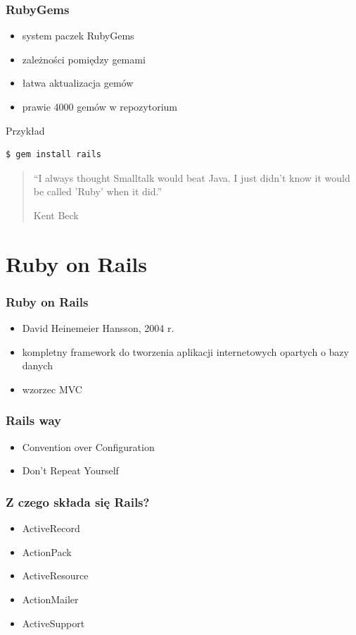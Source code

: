 \documentclass[12t]{beamer}
\begin{document}
\begin{frame}[fragile]
  \frametitle{RubyGems}
  \begin{itemize}
  \item system paczek RubyGems
  \item zależności pomiędzy gemami
  \item łatwa aktualizacja gemów
  \item prawie 4000 gemów w repozytorium
  \end{itemize}
  \begin{block}{Przykład}
\begin{verbatim}
$ gem install rails
\end{verbatim}
  \end{block}
\end{frame}

\begin{frame}
  \begin{quote}
    “I always thought Smalltalk would beat Java. I just
    didn't know it would be called 'Ruby' when it did.”

    \hfill Kent Beck
  \end{quote}
\end{frame}

\section{Ruby on Rails}
\begin{frame}
  \frametitle{Ruby on Rails}
  \begin{itemize}
  \item David Heinemeier Hansson, 2004 r.
  \item kompletny framework do tworzenia aplikacji internetowych
    opartych o bazy danych
  \item wzorzec MVC
  \end{itemize}
\end{frame}

\begin{frame}
  \frametitle{Rails way}
  \begin{itemize}
  \item Convention over Configuration
  \item Don't Repeat Yourself
  \end{itemize}
\end{frame}

\begin{frame}
  \frametitle{Z czego składa się Rails?}
  \begin{itemize}
  \item ActiveRecord
  \item ActionPack
  \item ActiveResource
  \item ActionMailer
  \item ActiveSupport
  \end{itemize}
\end{frame}
\end{document}
